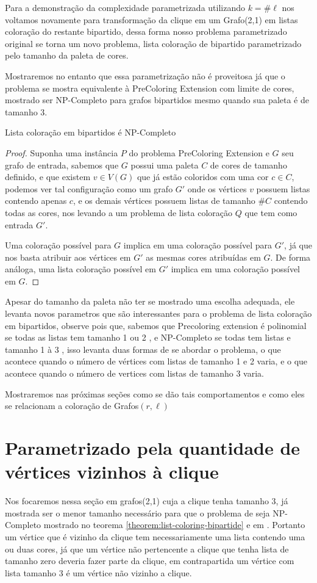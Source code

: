 Para a demonstração da complexidade parametrizada utilizando $k=\#\ell$ nos voltamos novamente para transformação da clique em um Grafo(2,1) em listas coloração do restante bipartido, dessa forma nosso problema parametrizado original se torna um novo problema, lista coloração de bipartido parametrizado pelo tamanho da paleta de cores. 

Mostraremos no entanto que essa parametrização não é proveitosa já que o problema se mostra equivalente à PreColoring Extension com limite de cores, mostrado ser NP-Completo para grafos bipartidos mesmo quando sua paleta é de tamanho 3\cite{kratochvil94}.

\begin{teorema}
	Lista coloração em bipartidos é NP-Completo
\end{teorema}
\label{theorem:list-coloring-bipartide}
\begin{proof}
	Suponha uma instância $P$ do problema PreColoring Extension e $G$ seu grafo de entrada, sabemos que $G$ possui uma paleta $C$ de cores de tamanho definido, e que existem $v \in V(G)$ que já estão coloridos com uma cor $c \in C$, podemos ver tal configuração como um grafo $G'$ onde os vértices $v$ possuem listas contendo apenas $c$, e os demais vértices possuem listas de tamanho $\#C$ contendo todas as cores, nos levando a um problema de lista coloração $Q$ que tem como entrada $G'$.
	
	Uma coloração possível para $G$ implica em uma coloração possível para $G'$, já que nos basta atribuir aos vértices em $G'$ as mesmas cores atribuídas em $G$. De forma análoga, uma lista coloração possível em $G'$ implica em uma coloração possível em $G$.
\end{proof}


Apesar do tamanho da paleta não ter se mostrado uma escolha adequada, ele levanta novos parametros que são interessantes para o problema de lista coloração em bipartidos, observe pois que, sabemos que Precoloring extension é polinomial se todas as listas tem tamanho 1 ou 2 \cite{hujter93}, e NP-Completo se todas tem listas e tamanho 1 à 3 \cite{kratochvil94}, isso levanta duas formas de se abordar o problema, o que acontece quando o número de vértices com listas de tamanho 1 e 2 varia, e o que acontece quando o número de vertices com listas de tamanho 3 varia.

Mostraremos nas próximas seções como se dão tais comportamentos e como eles se relacionam a coloração de Grafos$(r,\ell)$

\section{Parametrizado pela quantidade de vértices vizinhos à clique}
Nos focaremos nessa seção em grafos(2,1) cuja a clique tenha tamanho 3, já mostrada ser o menor tamanho necessário para que o problema de seja NP-Completo mostrado no teorema \ref{theorem:list-coloring-bipartide} e em \cite{kratochvil94}. Portanto um vértice que é vizinho da clique tem necessariamente uma lista contendo uma ou duas cores, já que um vértice não pertencente a clique que tenha lista de tamanho zero deveria fazer parte da clique, em contrapartida um vértice com lista tamanho 3 é um vértice não vizinho a clique. 

